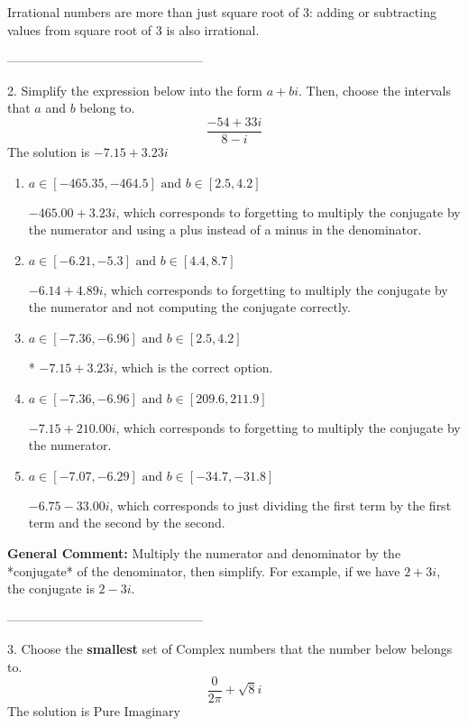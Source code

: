 \documentclass{extbook}[14pt]
\begin{document}
 Irrational numbers are more than just square root of 3: adding or subtracting values from square root of 3 is also irrational. 

-----------------------------------------------

2. Simplify the expression below into the form $a+bi$. Then, choose the intervals that $a$ and $b$ belong to.
\[ \frac{-54 + 33 i}{8 - i} \] 
The solution is $ -7.15  + 3.23 i $ 

\begin{enumerate}[label=\Alph*.] 
\item $ a \in [-465.35, -464.5] \text{ and } b \in [2.5, 4.2] $ 

  $-465.00  + 3.23 i$, which corresponds to forgetting to multiply the conjugate by the numerator and using a plus instead of a minus in the denominator. 
\item $ a \in [-6.21, -5.3] \text{ and } b \in [4.4, 8.7] $ 

  $-6.14  + 4.89 i$, which corresponds to forgetting to multiply the conjugate by the numerator and not computing the conjugate correctly. 
\item $ a \in [-7.36, -6.96] \text{ and } b \in [2.5, 4.2] $ 

 * $-7.15  + 3.23 i$, which is the correct option. 
\item $ a \in [-7.36, -6.96] \text{ and } b \in [209.6, 211.9] $ 

  $-7.15  + 210.00 i$, which corresponds to forgetting to multiply the conjugate by the numerator. 
\item $ a \in [-7.07, -6.29] \text{ and } b \in [-34.7, -31.8] $ 

  $-6.75  - 33.00 i$, which corresponds to just dividing the first term by the first term and the second by the second. 
\end{enumerate} 
 
\textbf{General Comment:} Multiply the numerator and denominator by the *conjugate* of the denominator, then simplify. For example, if we have $2+3i$, the conjugate is $2-3i$. 

-----------------------------------------------

3. Choose the \textbf{smallest} set of Complex numbers that the number below belongs to.
\[ \frac{0}{2 \pi}+\sqrt{8}i \] 
The solution is $ \text{Pure Imaginary} $ 
\end{document}

